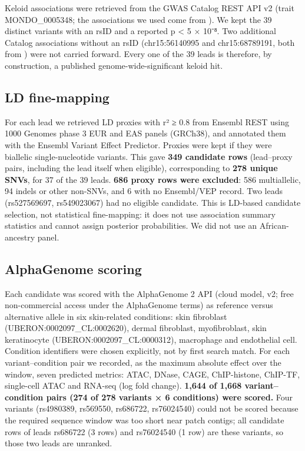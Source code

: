 \documentclass[10pt,twocolumn,a4paper]{article}
\begin{document}
Keloid associations were retrieved from the GWAS Catalog REST API v2 \cite{k21} (trait MONDO\_0005348; the associations we used come from \cite{k1,k2,k14,k15,k16,k17}). We kept the 39 distinct variants with an rsID and a reported p \textless{} 5 × 10⁻⁸. Two additional Catalog associations without an rsID (chr15:56140995 and chr15:68789191, both from \cite{k17}) were not carried forward. Every one of the 39 leads is therefore, by construction, a published genome-wide-significant keloid hit.

\subsection{LD fine-mapping}

For each lead we retrieved LD proxies with r² ≥ 0.8 from Ensembl REST \cite{k23} using 1000 Genomes phase 3 EUR and EAS panels (GRCh38), and annotated them with the Ensembl Variant Effect Predictor. Proxies were kept if they were biallelic single-nucleotide variants. This gave \textbf{349 candidate rows} (lead--proxy pairs, including the lead itself when eligible), corresponding to \textbf{278 unique SNVs}, for 37 of the 39 leads. \textbf{686 proxy rows were excluded}: 586 multiallelic, 94 indels or other non-SNVs, and 6 with no Ensembl/VEP record. Two leads (rs527569697, rs549023067) had no eligible candidate. This is LD-based candidate selection, not statistical fine-mapping: it does not use association summary statistics and cannot assign posterior probabilities. We did not use an African-ancestry panel.

\subsection{AlphaGenome scoring}

Each candidate was scored with the AlphaGenome 2 API \cite{k18} (cloud model, v2; free non-commercial access under the AlphaGenome terms) as reference versus alternative allele in six skin-related conditions: skin fibroblast (UBERON:0002097\_CL:0002620), dermal fibroblast, myofibroblast, skin keratinocyte (UBERON:0002097\_CL:0000312), macrophage and endothelial cell. Condition identifiers were chosen explicitly, not by first search match. For each variant--condition pair we recorded, as the maximum absolute effect over the window, seven predicted metrics: ATAC, DNase, CAGE, ChIP-histone, ChIP-TF, single-cell ATAC and RNA-seq (log fold change). \textbf{1,644 of 1,668 variant--condition pairs (274 of 278 variants × 6 conditions) were scored.} Four variants (rs4980389, rs569550, rs686722, rs76024540) could not be scored because the required sequence window was too short near patch contigs; all candidate rows of leads rs686722 (3 rows) and rs76024540 (1 row) are these variants, so those two leads are unranked.
\end{document}
